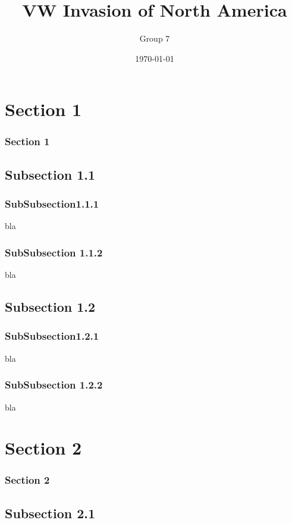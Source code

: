 \documentclass{beamer}
\title[Managerial Economics]{VW Invasion of North America} %
\author{Group 7} %
\institute[FDSM] %
{
\textit{Fudan Business} \\\textit{School of Management} \\ %
\medskip
}
\date{\today} %
\begin{document}
\maketitle

\section{Section 1}
\begin{frame}
\frametitle{Section 1}
\end{frame}

\subsection{Subsection 1.1}
\subsubsection{SubSubsection1.1.1}
\begin{frame}
bla
\end{frame}
\subsubsection{SubSubsection 1.1.2}
\begin{frame}
bla
\end{frame}

\subsection{Subsection 1.2}
\subsubsection{SubSubsection1.2.1}
\begin{frame}
bla
\end{frame}
\subsubsection{SubSubsection 1.2.2}
\begin{frame}
bla
\end{frame}

\section{Section 2}
\begin{frame}
\frametitle{Section 2}
\end{frame}

\subsection{Subsection 2.1}
\end{document}
